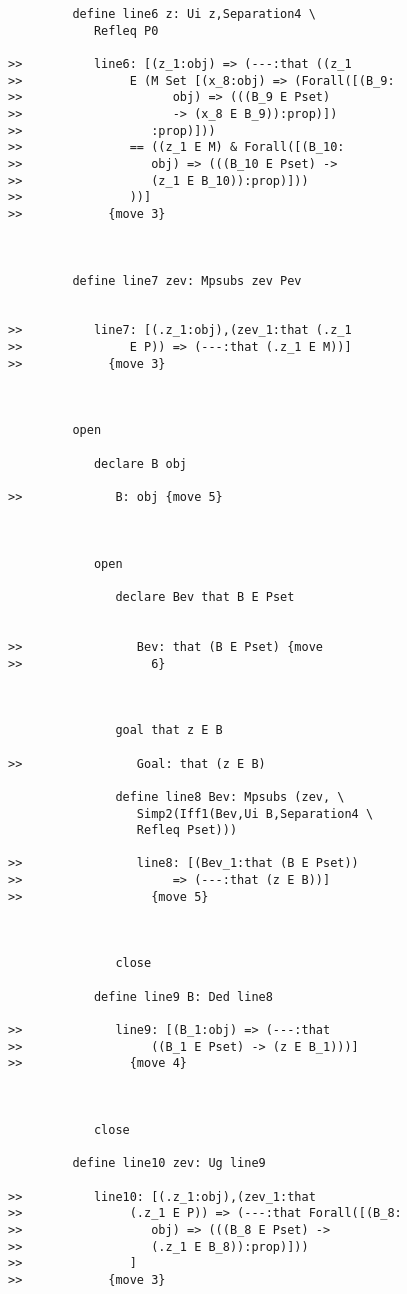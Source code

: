 \documentclass[12pt]{article}
\begin{document}
\begin{verbatim}
         define line6 z: Ui z,Separation4 \
            Refleq P0

>>          line6: [(z_1:obj) => (---:that ((z_1
>>               E (M Set [(x_8:obj) => (Forall([(B_9:
>>                     obj) => (((B_9 E Pset)
>>                     -> (x_8 E B_9)):prop)])
>>                  :prop)]))
>>               == ((z_1 E M) & Forall([(B_10:
>>                  obj) => (((B_10 E Pset) ->
>>                  (z_1 E B_10)):prop)]))
>>               ))]
>>            {move 3}



         define line7 zev: Mpsubs zev Pev


>>          line7: [(.z_1:obj),(zev_1:that (.z_1
>>               E P)) => (---:that (.z_1 E M))]
>>            {move 3}



         open

            declare B obj

>>             B: obj {move 5}



            open

               declare Bev that B E Pset


>>                Bev: that (B E Pset) {move
>>                  6}



               goal that z E B

>>                Goal: that (z E B)

               define line8 Bev: Mpsubs (zev, \
                  Simp2(Iff1(Bev,Ui B,Separation4 \
                  Refleq Pset)))

>>                line8: [(Bev_1:that (B E Pset))
>>                     => (---:that (z E B))]
>>                  {move 5}



               close

            define line9 B: Ded line8

>>             line9: [(B_1:obj) => (---:that
>>                  ((B_1 E Pset) -> (z E B_1)))]
>>               {move 4}



            close

         define line10 zev: Ug line9

>>          line10: [(.z_1:obj),(zev_1:that
>>               (.z_1 E P)) => (---:that Forall([(B_8:
>>                  obj) => (((B_8 E Pset) ->
>>                  (.z_1 E B_8)):prop)]))
>>               ]
>>            {move 3}




\end{verbatim}
\end{document}
